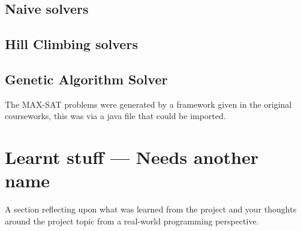 \documentclass[a4paper]{article}
\begin{document}
\subsection{Naive solvers}
\subsection{Hill Climbing solvers}
\subsection{Genetic Algorithm Solver}




The MAX-SAT problems were generated by a framework given in the original courseworks, this was via a java file that could be imported.

\section{Learnt stuff --- Needs another name}
A section reflecting upon what was learned from the project and your
thoughts around the project topic from a real-world programming perspective.
\end{document}
